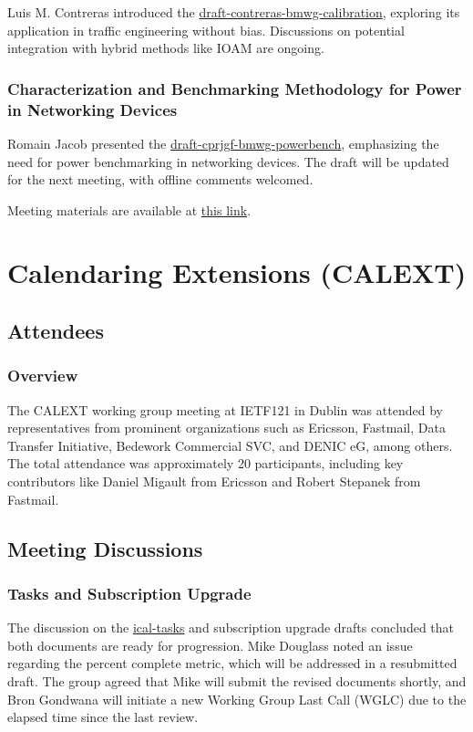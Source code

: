 \documentclass{article}
\begin{document}
Luis M. Contreras introduced the \href{https://datatracker.ietf.org/doc/html/draft-contreras-bmwg-calibration}{draft-contreras-bmwg-calibration}, exploring its application in traffic engineering without bias. Discussions on potential integration with hybrid methods like IOAM are ongoing.

\subsubsection{Characterization and Benchmarking Methodology for Power in Networking Devices}

Romain Jacob presented the \href{https://datatracker.ietf.org/doc/html/draft-cprjgf-bmwg-powerbench}{draft-cprjgf-bmwg-powerbench}, emphasizing the need for power benchmarking in networking devices. The draft will be updated for the next meeting, with offline comments welcomed.

Meeting materials are available at \href{https://datatracker.ietf.org/meeting/121/materials/slides-121-bmwg-ietf-121-bmwg-chairs-slides-00}{this link}.



\newpage

\section{Calendaring Extensions (CALEXT) }

\subsection{Attendees}

\subsubsection{Overview}
The CALEXT working group meeting at IETF121 in Dublin was attended by representatives from prominent organizations such as Ericsson, Fastmail, Data Transfer Initiative, Bedework Commercial SVC, and DENIC eG, among others. The total attendance was approximately 20 participants, including key contributors like Daniel Migault from Ericsson and Robert Stepanek from Fastmail.

\subsection{Meeting Discussions}

\subsubsection{Tasks and Subscription Upgrade}
The discussion on the \href{https://datatracker.ietf.org/doc/html/draft-ietf-calext-ical-tasks}{ical-tasks} and subscription upgrade drafts concluded that both documents are ready for progression. Mike Douglass noted an issue regarding the percent complete metric, which will be addressed in a resubmitted draft. The group agreed that Mike will submit the revised documents shortly, and Bron Gondwana will initiate a new Working Group Last Call (WGLC) due to the elapsed time since the last review.
\end{document}
